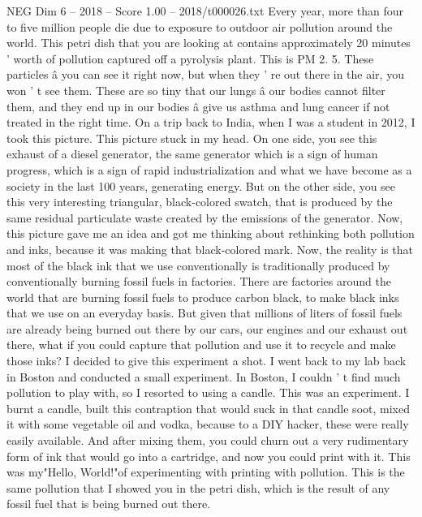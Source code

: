 \begin{textsample}{NEG Dim 6 – 2018 – Score 1.00 – 2018/t000026.txt}  \label{ex:f6_neg_016}
Every year, more than four to five million people die due to exposure to outdoor air pollution around the world.
This petri dish that you are looking at contains approximately 20 minutes ' worth of pollution captured off a pyrolysis plant.
This is PM 2. 5.
These particles â you can see it right now, but when they ' re out there in the air, you won ' t see them.
These are so tiny that our lungs â our bodies cannot filter them, and they end up in our bodies â give us asthma and lung cancer if not treated in the right time.
On a trip back to India, when I was a student in 2012, I took this picture.
This picture stuck in my head.
On one side, you see this exhaust of a diesel generator, the same generator which is a sign of human progress, which is a sign of rapid industrialization and what we have become as a society in the last 100 years, generating energy.
But on the other side, you see this very interesting triangular, black-colored swatch, that is produced by the same residual particulate waste created by the emissions of the generator.
Now, this picture gave me an idea and got me thinking about rethinking both pollution and inks, because it was making that black-colored mark.
Now, the reality is that most of the black ink that we use conventionally is traditionally produced by conventionally burning fossil fuels in factories.
There are factories around the world that are burning fossil fuels to produce carbon black, to make black inks that we use on an everyday basis.
But given that millions of liters of fossil fuels are already being burned out there by our cars, our engines and our exhaust out there, what if you could capture that pollution and use it to recycle and make those inks?
I decided to give this experiment a shot.
I went back to my lab back in Boston and conducted a small experiment.
In Boston, I couldn ' t find much pollution to play with, so I resorted to using a candle.
This was an experiment.
I burnt a candle, built this contraption that would suck in that candle soot, mixed it with some vegetable oil and vodka, because to a DIY hacker, these were really easily available.
And after mixing them, you could churn out a very rudimentary form of ink that would go into a cartridge, and now you could print with it.
This was my"Hello, World!"of experimenting with printing with pollution.
This is the same pollution that I showed you in the petri dish, which is the result of any fossil fuel that is being burned out there.

\end{textsample}
